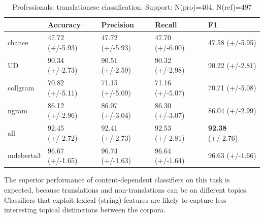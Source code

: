 \begin{table}[H]
	\centering
	\begin{tabular}{p{2.9cm}|llll}
		\toprule
		& Accuracy        & Precision       & Recall        & F1              \\
		\midrule
		chance          & 47.72 (+/-5.93) & 47.72 (+/-5.93) & 47.70 (+/-6.00) & 47.58 (+/-5.95) \\
		\midrule
		UD              & 90.34 (+/-2.73) & 90.51 (+/-2.59) & 90.32 (+/-2.98) & 90.22 (+/-2.81) \\
		collgram        & 70.82 (+/-5.11) & 71.15 (+/-5.09) & 71.16 (+/-5.07) & 70.71 (+/-5.08) \\
		ngram           & 86.12 (+/-2.96) & 86.07 (+/-3.04) & 86.30 (+/-3.07) & 86.04 (+/-2.99) \\
		all             & 92.45 (+/-2.72) & 92.41 (+/-2.73) & 92.53 (+/-2.81) & \textbf{92.38} (+/-2.76) \\
		\midrule
		mdeberta3  & 96.67 (+/-1.65) & 96.74 (+/-1.63) & 96.64 (+/-1.64) & \boxit{0.4in} 96.63 (+/-1.66)\\		
		\bottomrule
	\end{tabular}
	\caption{\label{tab:pro-ref}Professionals: translationese classification. Support: N(pro)=404, N(ref)=497}
\end{table}

The superior performance of content-dependent classifiers on this task is expected, because translations and non-translations can be on different topics. Classifiers that exploit lexical (string) features are likely to capture less interesting topical distinctions between the corpora.

